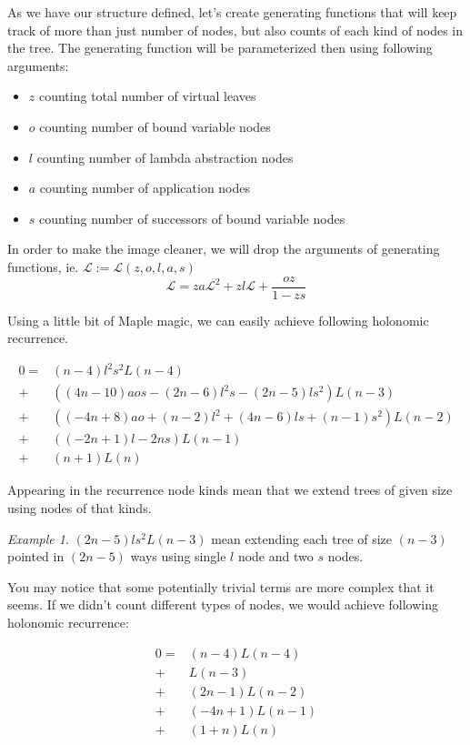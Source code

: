 \documentclass[final]{article}
\theoremstyle{definition}
\theoremstyle{remark}
\newtheorem{example}{Example}[subsection]
\newcommand{\gf}[1]{\ensuremath{\mathcal{#1}}}
\begin{document}
As we have our structure defined, let's create generating functions that will keep track of more than just number of nodes, but also counts of each kind of nodes in the tree. The generating function will be parameterized then using following arguments:
\begin{itemize}
    \item \(z\) counting total number of virtual leaves
    \item \(o\) counting number of bound variable nodes
    \item \(l\) counting number of lambda abstraction nodes
    \item \(a\) counting number of application nodes
    \item \(s\) counting number of successors of bound variable nodes
\end{itemize}

In order to make the image cleaner, we will drop the arguments of generating functions, ie. \(\gf{L} := \gf{L}(z, o, l, a, s)\)
\[\gf{L} = z a \gf{L}^2 + z l \gf{L} + \frac{o z}{1 - z s}\]

Using a little bit of Maple magic, we can easily achieve following holonomic recurrence.

\[\begin{array}{rl}
        0 =& (n - 4) l^2 s^2 L(n - 4)\\
        +& ((4 n - 10) a o s - (2 n - 6) l^2 s - (2 n - 5) l s^2) L(n - 3)\\
        +& ((-4 n + 8) a o + (n - 2) l^2 + (4 n - 6) l s + (n - 1) s^2) L(n - 2)\\
        +& ((-2 n + 1) l - 2 n s) L(n - 1)\\
        +& (n + 1) L(n)
\end{array}\]

Appearing in the recurrence node kinds mean that we extend trees of given size using nodes of that kinds.

\begin{example}
    \((2n - 5) l s^2 L(n - 3)\) mean extending each tree of size \((n - 3)\) pointed in \((2n - 5)\) ways using single \(l\) node and two \(s\) nodes.
\end{example}

You may notice that some potentially trivial terms are more complex that it seems. If we didn't count different types of nodes, we would achieve following holonomic recurrence:

\[\begin{array}{rl}
        0 =& (n - 4) L(n - 4)\\
        +& L(n - 3)\\
        +& (2 n - 1) L(n - 2)\\
        +& (-4 n + 1) L(n - 1)\\
        +& (1 + n) L(n)
\end{array}\]
\end{document}
